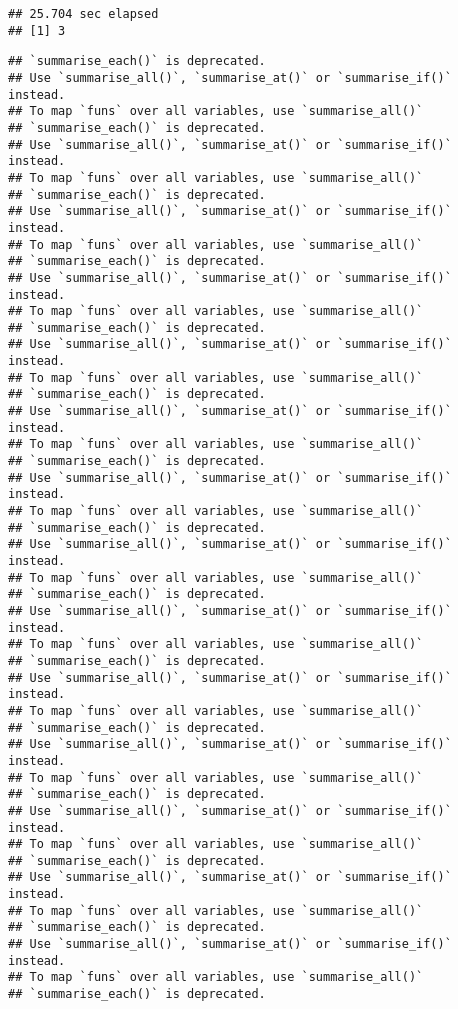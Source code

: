 \documentclass[]{article}
\begin{document}
\begin{verbatim}
## 25.704 sec elapsed
## [1] 3
\end{verbatim}

\begin{verbatim}
## `summarise_each()` is deprecated.
## Use `summarise_all()`, `summarise_at()` or `summarise_if()` instead.
## To map `funs` over all variables, use `summarise_all()`
## `summarise_each()` is deprecated.
## Use `summarise_all()`, `summarise_at()` or `summarise_if()` instead.
## To map `funs` over all variables, use `summarise_all()`
## `summarise_each()` is deprecated.
## Use `summarise_all()`, `summarise_at()` or `summarise_if()` instead.
## To map `funs` over all variables, use `summarise_all()`
## `summarise_each()` is deprecated.
## Use `summarise_all()`, `summarise_at()` or `summarise_if()` instead.
## To map `funs` over all variables, use `summarise_all()`
## `summarise_each()` is deprecated.
## Use `summarise_all()`, `summarise_at()` or `summarise_if()` instead.
## To map `funs` over all variables, use `summarise_all()`
## `summarise_each()` is deprecated.
## Use `summarise_all()`, `summarise_at()` or `summarise_if()` instead.
## To map `funs` over all variables, use `summarise_all()`
## `summarise_each()` is deprecated.
## Use `summarise_all()`, `summarise_at()` or `summarise_if()` instead.
## To map `funs` over all variables, use `summarise_all()`
## `summarise_each()` is deprecated.
## Use `summarise_all()`, `summarise_at()` or `summarise_if()` instead.
## To map `funs` over all variables, use `summarise_all()`
## `summarise_each()` is deprecated.
## Use `summarise_all()`, `summarise_at()` or `summarise_if()` instead.
## To map `funs` over all variables, use `summarise_all()`
## `summarise_each()` is deprecated.
## Use `summarise_all()`, `summarise_at()` or `summarise_if()` instead.
## To map `funs` over all variables, use `summarise_all()`
## `summarise_each()` is deprecated.
## Use `summarise_all()`, `summarise_at()` or `summarise_if()` instead.
## To map `funs` over all variables, use `summarise_all()`
## `summarise_each()` is deprecated.
## Use `summarise_all()`, `summarise_at()` or `summarise_if()` instead.
## To map `funs` over all variables, use `summarise_all()`
## `summarise_each()` is deprecated.
## Use `summarise_all()`, `summarise_at()` or `summarise_if()` instead.
## To map `funs` over all variables, use `summarise_all()`
## `summarise_each()` is deprecated.
## Use `summarise_all()`, `summarise_at()` or `summarise_if()` instead.
## To map `funs` over all variables, use `summarise_all()`
## `summarise_each()` is deprecated.

\end{verbatim}
\end{document}
